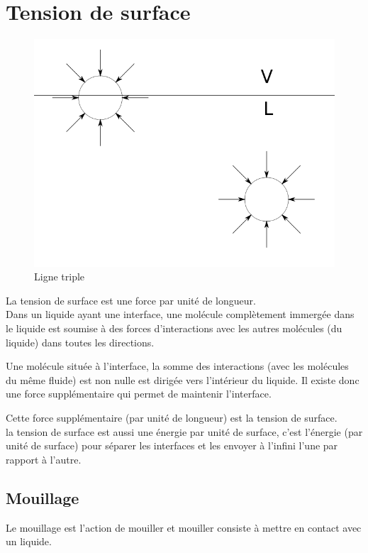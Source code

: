 \section{Tension de surface}
\begin{figure}[ht]
	\centering
	\includegraphics[scale = 0.3]{./image/rondforces.png}
	\caption{Ligne triple}
\end{figure}

La tension de surface est une force par unité de longueur.\\ 

Dans un liquide ayant une interface, une molécule complètement immergée dans le liquide est soumise à des forces d'interactions avec les autres molécules (du liquide) dans toutes les directions. 

Une molécule située à l'interface, la somme des interactions (avec les molécules du même fluide) est non nulle est dirigée vers l'intérieur du liquide. Il existe donc une force supplémentaire qui permet de maintenir l'interface.

Cette force supplémentaire (par unité de longueur) est la tension de surface.\\



la tension de surface est aussi une énergie par unité de surface, c'est l'énergie (par unité de surface) pour séparer les interfaces et les envoyer à l'infini l'une par rapport à l'autre.


\subsection{Mouillage}
Le mouillage est l'action de mouiller et mouiller consiste à  mettre en contact avec un liquide.\\


